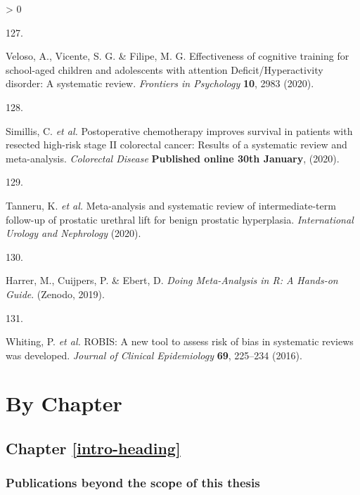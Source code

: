 \documentclass[a4paper, twoside]{templates/ociamthesis}
\newlength{\cslhangindent}
\newlength{\csllabelwidth}
\newenvironment{CSLReferences}[3] %
 {%
  \setlength{\parindent}{0pt}
  \ifodd #1 \everypar{\setlength{\hangindent}{\cslhangindent}}\ignorespaces\fi
  \ifnum #2 > 0
  \setlength{\parskip}{#2\baselineskip}
  \fi
 }%
 {}
\newcommand{\CSLLeftMargin}[1]{\parbox[t]{\maxof{\widthof{#1}}{\csllabelwidth}}{#1}}
\newcommand{\CSLRightInline}[1]{\parbox[t]{\linewidth - \csllabelwidth}{#1}}
\begin{document}
\begin{CSLReferences}{0}{0}
\leavevmode\hypertarget{ref-veloso2020effectiveness}{}%
\CSLLeftMargin{127. }
\CSLRightInline{Veloso, A., Vicente, S. G. \& Filipe, M. G. Effectiveness of cognitive training for school-aged children and adolescents with attention {Deficit}/{Hyperactivity} disorder: {A} systematic review. \emph{Frontiers in Psychology} \textbf{10}, 2983 (2020).}

\leavevmode\hypertarget{ref-simillis2020}{}%
\CSLLeftMargin{128. }
\CSLRightInline{Simillis, C. \emph{et al.} Postoperative chemotherapy improves survival in patients with resected high-risk stage {II} colorectal cancer: Results of a systematic review and meta-analysis. \emph{Colorectal Disease} \textbf{Published online 30th January}, (2020).}

\leavevmode\hypertarget{ref-tanneru2020}{}%
\CSLLeftMargin{129. }
\CSLRightInline{Tanneru, K. \emph{et al.} Meta-analysis and systematic review of intermediate-term follow-up of prostatic urethral lift for benign prostatic hyperplasia. \emph{International Urology and Nephrology} (2020).}

\leavevmode\hypertarget{ref-mathias_harrer_2019_2551803}{}%
\CSLLeftMargin{130. }
\CSLRightInline{Harrer, M., Cuijpers, P. \& Ebert, D. \emph{Doing {Meta}-{Analysis} in {R}: {A Hands}-on {Guide}}. ({Zenodo}, 2019).}

\leavevmode\hypertarget{ref-whiting2016robis}{}%
\CSLLeftMargin{131. }
\CSLRightInline{Whiting, P. \emph{et al.} {ROBIS}: A new tool to assess risk of bias in systematic reviews was developed. \emph{Journal of Clinical Epidemiology} \textbf{69}, 225--234 (2016).}

\end{CSLReferences}

\startappendices

\hypertarget{chapter-appendix-heading}{%
\chapter{By Chapter}\label{chapter-appendix-heading}}

\hypertarget{appendix-into}{%
\section{Chapter \ref{intro-heading}}\label{appendix-into}}

\hypertarget{appendix-publications}{%
\subsection{Publications beyond the scope of this thesis}\label{appendix-publications}}
\end{document}
